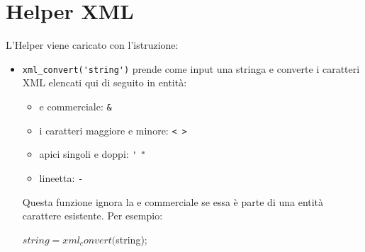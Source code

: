 \section{Helper XML}
\label{helper:xml}

L'Helper viene caricato con l'istruzione:


\begin{itemize}
\item \verb|xml_convert('string')| prende come input una stringa e converte i caratteri \ac{XML} elencati qui di seguito in entità:

\begin{itemize}
\item e commerciale: \verb|&|
\item i caratteri maggiore e minore: \verb|< >|
\item apici singoli e doppi: \verb|'|  \verb|"|
\item lineetta: \verb|-|
\end{itemize}

Questa funzione ignora la e commerciale se essa è parte di una entità carattere esistente. Per esempio:

\begin{code}
$string = xml_convert($string);
\end{code}

\end{itemize}